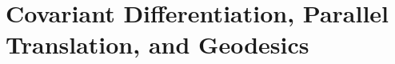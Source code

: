 \documentclass[Shifrin_Solutions_Spring_2015]{subfiles}
\begin{document}
\section{Covariant Differentiation, Parallel Translation, and Geodesics}

\begin{exercise}

\end{exercise}


\begin{exercise}

\end{exercise}


\begin{exercise}

\end{exercise}


\begin{exercise}

\end{exercise}

\begin{exercise}

\end{exercise}


\begin{exercise}

\end{exercise}


\begin{exercise}

\end{exercise}


\begin{exercise}

\end{exercise}

\begin{exercise}

\end{exercise}


\begin{exercise}

\end{exercise}


\begin{exercise}

\end{exercise}


\begin{exercise}

\end{exercise}
\end{document}
